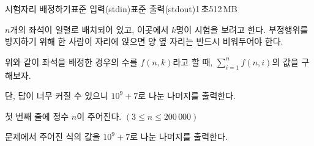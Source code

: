\begin{problem}{시험자리 배정하기}{표준 입력(stdin)}{표준 출력(stdout)}{1\,초}{512\,MB}

$n$개의 좌석이 일렬로 배치되어 있고, 이곳에서 $k$명이 시험을 보려고 한다. 부정행위를 방지하기 위해 한 사람이 자리에 앉으면 양 옆 자리는 반드시 비워두어야 한다.

위와 같이 좌석을 배정한 경우의 수를 $f(n, k)$라고 할 때, $\sum_{i=1}^n f(n, i)$의 값을 구해보자.

단, 답이 너무 커질 수 있으니 $10^9+7$로 나눈 나머지를 출력한다.

\InputFile
첫 번째 줄에 정수 $n$이 주어진다. $(3 \le n \le 200\,000)$

\OutputFile
문제에서 주어진 식의 값을 $10^9+7$로 나눈 나머지를 출력한다.

\Examples

\begin{example}
%
%
\end{example}

\end{problem}
